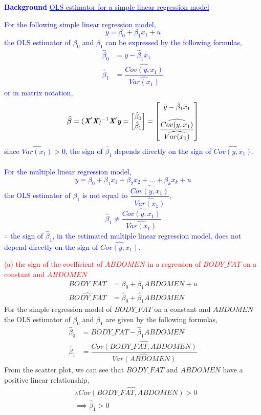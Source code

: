 \documentclass[12pt]{report}
\newenvironment{blueframed}[1][blue]
{\def\FrameCommand{\fboxsep=\FrameSep\fcolorbox{#1}{white}}%
	\MakeFramed {\advance\hsize-\width \FrameRestore}}
{\endMakeFramed}
\begin{document}
\justify
\begin{blueframed}
	\textcolor{blue}{\textbf{Background}}
	\vspace{-\baselineskip}
	\justify
	\textcolor{blue}{\underline{OLS estimator for a simple linear regression model}}
	
	\noindent \textcolor{blue}
	{
		\noindent For the following simple linear regression model, $$y = \beta_0 + \beta_1 x_1 + u$$  the OLS estimator of $\beta_0$ and $\beta_1$ can be expressed by the following formulas,
		\begin{align*}
		\hat{\beta}_0 &= \bar{y} - \hat{\beta}_1\bar{x}_1 \\
		\hat{\beta}_1 &= \dfrac{\widehat{Cov(y,x_1)}}{\widehat{Var(x_1)}}
		\end{align*}
		or in matrix notation, $$\widehat{\boldsymbol{\beta}} 
		= (\textit{\textbf{X}}'\textit{\textbf{X}})^{-1}\textit{\textbf{X}}'\textit{\textbf{y}}
		=
		\begin{bmatrix}
		\hat{\beta}_0 \\
		\hat{\beta}_1 
		\end{bmatrix}
		=
		\begin{bmatrix}
		\bar{y} - \hat{\beta}_1\bar{x}_1 \\[10pt]
		\dfrac{\widehat{Cov(y,x_1)}}{\widehat{Var(x_1)}} 
		\end{bmatrix}$$
		since $\widehat{Var(x_1)}>0$, the sign of $\hat{\beta}_1$ depends directly on the sign of $\widehat{Cov(y,x_1)}$. \\ \\ For the multiple linear regression model, $$y = \beta_0 + \beta_1 x_1 + \beta_2 x_2 + \dots + \beta_k x_k + u$$ the OLS estimator of $\beta_1$ is not equal to $\dfrac{\widehat{Cov(y,x_1)}}{\widehat{Var(x_1)}}$, $$\hat{\beta}_1 \neq \dfrac{\widehat{Cov(y,x_1)}}{\widehat{Var(x_1)}}$$ $\therefore$ the sign of $\hat{\beta}_1$, in the estimated multiple linear regression model, does not depend directly on the sign of $\widehat{Cov(y,x_1)}$.
}\end{blueframed}

\noindent \textcolor{red}{(a) the sign of the coefficient of $ABDOMEN$ in a regression of $BODY\_FAT$ on a constant and $ABDOMEN$}
\begin{align*}
	BODY\_FAT &= \beta_0 + \beta_1 ABDOMEN + u \\
	\widehat{BODY\_FAT} &= \hat{\beta}_0 + \hat{\beta}_1 ABDOMEN
\end{align*}
\noindent For the simple regression model of $BODY\_FAT$ on a constant and $ABDOMEN$ the OLS estimator of $\beta_0$ and $\beta_1$ are given by the following formulas,
\begin{align*}
	\hat{\beta}_0 &= \overline{BODY\_FAT} - \hat{\beta}_1\overline{ABDOMEN} \\
	\hat{\beta}_1 &= \dfrac{\widehat{Cov(BODY\_FAT,ABDOMEN)}}{\widehat{Var(ABDOMEN)}}
\end{align*}
\noindent From the scatter plot, we can see that $BODY\_FAT$ and $ABDOMEN$ have a positive linear relationship, 
\begin{align*}
	&\therefore \widehat{Cov(BODY\_FAT,ABDOMEN)}>0 \\
	&\implies \hat{\beta}_1 > 0
\end{align*}
\end{document}
